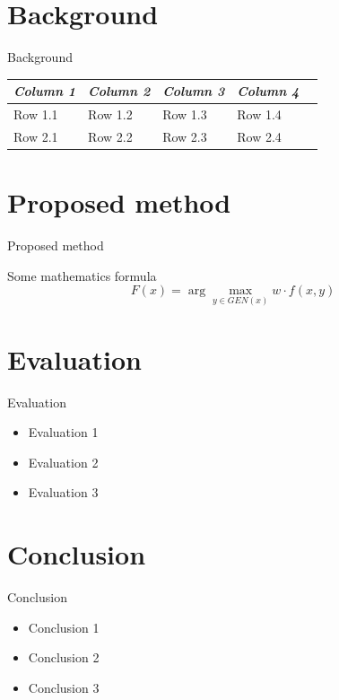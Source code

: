 \documentclass[11pt]{beamer}
\newcommand{\argmax}{\arg\!\max}
\begin{document}
\section{Background}
\begin{frame}{Background}
\begin{center}
 
\begin{tabular} {l l l l l}
\toprule
\it Column 1 & \it Column 2 & \it Column 3 & \it Column 4 \\
\midrule
 
Row 1.1 & Row 1.2 & Row 1.3 & Row 1.4 \\
Row 2.1 & Row 2.2 & Row 2.3 & Row 2.4 \\
 
\bottomrule
\end{tabular}
 
\end{center}
\end{frame}
 
\section{Proposed method}
\begin{frame}{Proposed method}
 
Some mathematics formula $$F(x) = \argmax_{y \in GEN(x)} w \cdot f(x, y)$$
\end{frame}
 
\section{Evaluation}
\begin{frame}{Evaluation}
\begin{itemize}
\item Evaluation 1
\item Evaluation 2
\item Evaluation 3
\end{itemize}
\end{frame}
 
\section{Conclusion}
\begin{frame}{Conclusion}
\begin{itemize}
\item Conclusion 1
\item Conclusion 2
\item Conclusion 3
\end{itemize}
\end{frame}
 
\end{document}
